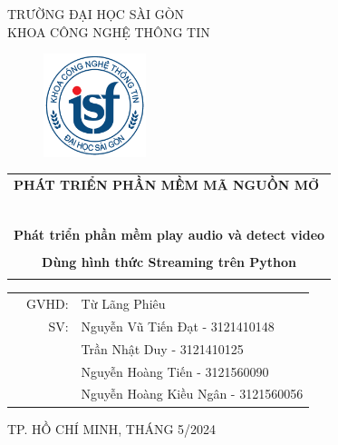 \documentclass[a4paper]{article}
\begin{document}
\begin{titlepage}
\begin{center}
TRƯỜNG ĐẠI HỌC SÀI GÒN \\
KHOA CÔNG NGHỆ THÔNG TIN
\end{center}
\vspace{1cm}

\begin{figure}[h!]
\begin{center}
\includegraphics[width=3cm]{logoITSGU.png}
\end{center}
\end{figure}

\vspace{1cm}


\begin{center}
\begin{tabular}{c}
	\multicolumn{1}{l}{\textbf{{\Large PHÁT TRIỂN PHẦN MỀM MÃ NGUỒN MỞ}}}\\
	~~\\
	\hline
	\\
	\multicolumn{1}{l}{\textbf{{\Large Phát triển phần mềm play audio và detect video}}}\\
	\\
	
	\textbf{{\Large Dùng hình thức Streaming trên Python}}\\
	\\
	\hline
\end{tabular}
\end{center}

\vspace{3cm}

\begin{table}[h]
\begin{tabular}{rrl}
\hspace{5 cm} & GVHD: &Từ Lãng Phiêu\\
& SV: & Nguyễn Vũ Tiến Đạt - 3121410148\\
& & Trần Nhật Duy - 3121410125 \\
& & Nguyễn Hoàng Tiến - 3121560090 \\
& & Nguyễn Hoàng Kiều Ngân - 3121560056 \\
\end{tabular}
\vspace{1.5 cm}
\end{table}

\begin{center}

{\footnotesize TP. HỒ CHÍ MINH, THÁNG 5/2024}
\end{center}
\end{titlepage}
\end{document}
